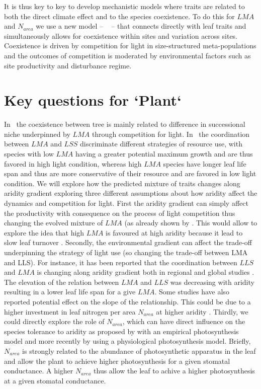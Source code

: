 \documentclass[a4paper,11pt]{article}
\begin{document}
It is thus key to key to develop mechanistic models where traits are related to both the direct climate effect and to the species coexistence. To do this for $LMA$ and $N_{area}$ we use a new model -- \plant\ \citep{Falster-2016,Falster-2017} -- that connects directly with leaf traits and simultaneously allows for coexistence within sites and variation across sites. Coexistence is driven by competition for light in size-structured meta-populations and the outcomes of competition is moderated by environmental factors such as site productivity and disturbance regime.

\section{Key questions for `Plant`}

In \plant\ the coexistence between tree is mainly related to difference in successional niche underpinned by $LMA$ through competition for light. In \plant\ the coordination between $LMA$ and $LSS$ discriminate different strategies of resource use, with species with low $LMA$ having a greater potential maximum growth and are thus favored in high light condition, whereas high $LMA$ species have longer leaf life span and thus are more conservative of their resource and are favored in low light condition.  We will explore how the predicted mixture of traits changes along aridity gradient exploring three different assumptions about how aridity
affect the dynamics and competition for light. First the aridity gradient can simply affect
the productivity with consequence on the process of light
competition thus changing the evolved mixture of $LMA$ (as already shown by \citep{Falster-2017}. This would allow to explore the idea that high $LMA$ is favoured at high aridity because it lead to slow leaf turnover \citep{Wright-2002b}. Secondly, the environmental gradient can affect the
trade-off underpinning the strategy of light use (so changing the
trade-off between LMA and LLS). For instance, it has been reported that the coordination between $LLS$ and $LMA$ is changing along aridity gradient both in regional \citep{Wright-2002b} and global studies \citep{Wright-2004}. The elevation of the relation between $LMA$ and $LLS$ was decreasing with aridity resulting in a lower leaf life span for a give $LMA$. Some studies have also reported potential effect on the slope of the relationship. This could be due to a higher investment in leaf nitrogen per area $N_{area}$ at higher aridity \citep{Wright-2002}. Thirdly, we could directly explore the role of $N_{area}$, which can have direct influence on the species tolerance to aridity as proposed by \citet{Wright-2003} with an empirical photosynthesis model and more recently by \citet{Prentice-2014,Dong-2017} using a physiological photosynthesis model. Briefly, $N_{area}$ is strongly related to the abundance of photosynthetic apparatus in the leaf and allow the plant to achieve higher photosynthesis for a given stomatal conductance. A higher $N_{area}$ thus allow the leaf to achive a higher photosynthesis at a given stomatal conductance.
\end{document}
